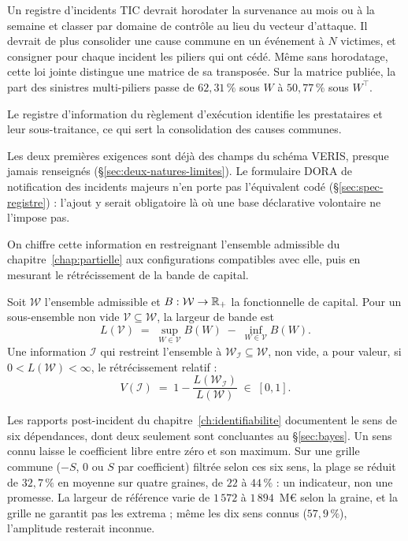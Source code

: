 Un registre d'incidents TIC devrait horodater la survenance au mois ou à la semaine et classer par
domaine de contrôle au lieu du vecteur d'attaque. Il devrait de plus consolider une cause commune en
un événement à $N$ victimes, et consigner pour chaque incident les piliers qui ont cédé. Même sans
horodatage, cette loi jointe distingue une matrice de sa transposée. Sur la matrice publiée, la part
des sinistres multi-piliers passe de $62{,}31\,\%$ sous $W$ à $50{,}77\,\%$ sous $W^\top$.

Le registre d'information du règlement d'exécution \citep{eu2024_2956} identifie les prestataires et
leur sous-traitance, ce qui sert la consolidation des causes communes.

Les deux premières exigences sont déjà des champs du schéma VERIS, presque jamais renseignés
(\S\ref{sec:deux-natures-limites}). Le formulaire DORA de notification des incidents majeurs
\citep{eu2025_302} n'en porte pas l'équivalent codé (\S\ref{sec:spec-registre}) : l'ajout y serait
obligatoire là où une base déclarative volontaire ne l'impose pas.

On chiffre cette information en restreignant l'ensemble admissible du chapitre~\ref{chap:partielle}
aux configurations compatibles avec elle, puis en mesurant le rétrécissement de la bande de capital.

\begin{definition}\label{def:voi}
Soit $\mathcal{W}$ l'ensemble admissible et $B:\mathcal{W}\to\mathbb{R}_+$ la fonctionnelle de
capital. Pour un sous-ensemble non vide $\mathcal{V}\subseteq\mathcal{W}$, la largeur de bande est
\begin{equation}
  L(\mathcal{V}) \;=\; \sup_{W\in\mathcal{V}}B(W)\;-\;\inf_{W\in\mathcal{V}}B(W).
  \label{eq:largeur-bande}
\end{equation}
Une information $\mathcal{I}$ qui restreint l'ensemble à $\mathcal{W}_{\mathcal{I}}\subseteq
\mathcal{W}$, non vide, a pour valeur, si $0<L(\mathcal W)<\infty$, le rétrécissement relatif :
\begin{equation}
  V(\mathcal{I}) \;=\; 1-\frac{L(\mathcal{W}_{\mathcal{I}})}{L(\mathcal{W})} \;\in\;[0,1].
  \label{eq:voi}
\end{equation}
\end{definition}

Les rapports post-incident du chapitre~\ref{ch:identifiabilite} documentent le sens de six dépendances, dont deux seulement sont concluantes au \S\ref{sec:bayes}. Un sens connu laisse le coefficient libre entre zéro et son maximum. Sur une grille commune ($-S$, $0$ ou $S$ par coefficient) filtrée selon ces six sens, la plage se réduit de $32{,}7\,\%$ en moyenne sur quatre graines, de $22$ à $44\,\%$ : un indicateur, non une promesse. La largeur de référence varie de $1\,572$ à $1\,894$~M\euro{} selon la graine, et la grille ne garantit pas les extrema ; même les dix sens connus ($57{,}9\,\%$), l'amplitude resterait inconnue.

